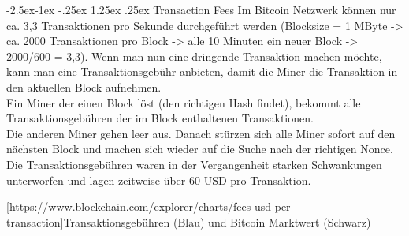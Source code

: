 \documentclass[10pt,a4paper,titlepage]{paper}
\makeatletter
\renewcommand\paragraph{\@startsection{paragraph}{4}{\z@}%
            {-2.5ex\@plus -1ex \@minus -.25ex}%
            {1.25ex \@plus .25ex}%
            {\normalfont\normalsize\bfseries}}
\makeatother
\begin{document}
\paragraph{Transaction Fees}
Im Bitcoin Netzwerk können nur ca. 3,3 Transaktionen pro Sekunde durchgeführt werden (Blocksize = 1 MByte -> ca. 2000 Transaktionen pro Block -> alle 10 Minuten ein neuer Block -> 2000/600 = 3,3). Wenn man nun eine dringende Transaktion machen möchte, kann man eine Transaktionsgebühr anbieten, damit die Miner die Transaktion in den aktuellen Block aufnehmen.\\
Ein Miner der einen Block löst (den richtigen Hash findet), bekommt alle Transaktionsgebühren der im Block enthaltenen Transaktionen.\\
Die anderen Miner gehen leer aus. Danach stürzen sich alle Miner sofort auf den nächsten Block und machen sich wieder auf die Suche nach der richtigen Nonce.\\
Die Transaktionsgebühren waren in der Vergangenheit starken Schwankungen unterworfen und lagen zeitweise über 60 USD pro Transaktion.
\begin{center}
[https://www.blockchain.com/explorer/charts/fees-usd-per-transaction]{Transaktionsgebühren (Blau) und Bitcoin Marktwert (Schwarz)}
\end{center}
 
\end{document}
